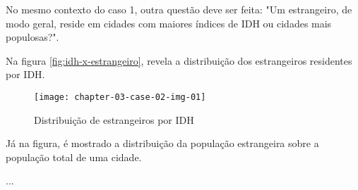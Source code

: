 No mesmo contexto do caso 1, outra questão deve ser feita: "Um estrangeiro, de modo geral, reside em cidades com maiores índices de IDH ou cidades mais populosas?".

Na figura \autoref{fig:idh-x-estrangeiro}, revela a distribuição dos estrangeiros residentes por IDH.

\begin{figure}[H]
  \centering
  \caption{\label{fig:idh-x-estrangeiro}Distribuição de estrangeiros por IDH}
  \label{fig:der}
  \texttt{[image: chapter-03-case-02-img-01]}
\end{figure}

Já na figura, é mostrado a distribuição da população estrangeira sobre a população total de uma cidade.

...




